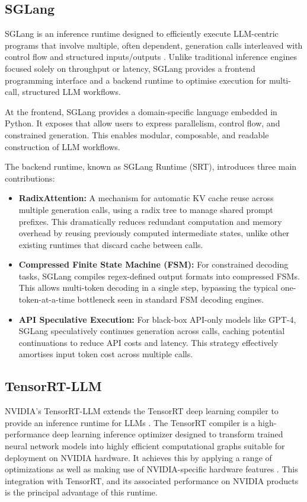 \documentclass[12pt,twoside]{report}
\begin{document}
\subsection{SGLang}
SGLang is an inference runtime designed to efficiently execute LLM-centric programs that involve multiple, often dependent, generation calls interleaved with control flow and structured inputs/outputs \cite{zheng2024sglang}. 
Unlike traditional inference engines focused solely on throughput or latency, SGLang provides a frontend programming interface and a backend runtime to optimise execution for multi-call, structured LLM workflows.

At the frontend, SGLang provides a domain-specific language embedded in Python. 
It exposes that allow users to express parallelism, control flow, and constrained generation.
This enables modular, composable, and readable construction of LLM workflows.

The backend runtime, known as SGLang Runtime (SRT), introduces three main contributions: 
\begin{itemize}
  \item \textbf{RadixAttention:} A mechanism for automatic KV cache reuse across multiple generation calls, using a radix tree to manage shared prompt prefixes. 
    This dramatically reduces redundant computation and memory overhead by reusing previously computed intermediate states, unlike other existing runtimes that discard cache between calls.
  \item \textbf{Compressed Finite State Machine (FSM):} For constrained decoding tasks, SGLang compiles regex-defined output formats into compressed FSMs. 
    This allows multi-token decoding in a single step, bypassing the typical one-token-at-a-time bottleneck seen in standard FSM decoding engines.
  \item \textbf{API Speculative Execution:} For black-box API-only models like GPT-4, SGLang speculatively continues generation across calls, caching potential continuations to reduce API costs and latency. 
    This strategy effectively amortises input token cost across multiple calls.
\end{itemize}

\subsection{TensorRT-LLM}
NVIDIA's TensorRT-LLM extends the TensorRT deep learning compiler to provide an inference runtime for LLMs \cite{nvidiainferencewhitepaper}.
The TensorRT compiler is a high-performance deep learning inference optimizer designed to transform trained neural network models into highly efficient computational graphs suitable for deployment on NVIDIA hardware. 
It achieves this by applying a range of optimizations as well as making use of NVIDIA-specific hardware features \cite{nvidiainferencewhitepaper}. 
This integration with TensorRT, and its associated performance on NVIDIA products is the principal advantage of this runtime.
\end{document}
